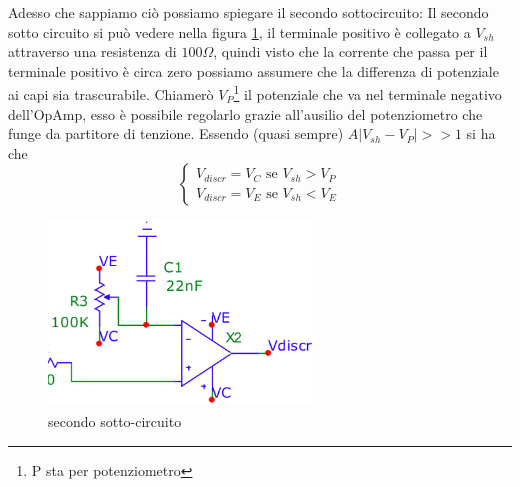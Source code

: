 \documentclass{article}
\begin{document}
			Adesso che sappiamo ciò possiamo spiegare il secondo sottocircuito:
			Il secondo sotto circuito si può vedere nella figura \ref{fig:circ2}, il terminale positivo è collegato a $V_{sh}$ attraverso una resistenza di $100\Omega$, quindi visto che la corrente che passa per il terminale positivo è circa zero possiamo assumere che la differenza di potenziale ai capi sia trascurabile.\newline
			Chiamerò $V_P$\footnote{P sta per potenziometro} il potenziale che va nel terminale negativo dell'OpAmp, esso è possibile regolarlo grazie all'ausilio del potenziometro che funge da partitore di tenzione.\newline
			Essendo (quasi sempre) $A|V_{sh}-V_P|>>1$ si ha che 
			\begin{equation}
				\begin{cases}
					V_{discr}=V_C\textrm{ se } V_{sh}>V_P\\
					V_{discr}=V_E \textrm{ se } V_{sh}<V_E
				\end{cases}
			\end{equation}
			\begin{figure}
				\label{fig:circ2}
				\centering
				\includegraphics[width=70mm]{immagini/circ2a.png}
				\caption{secondo sotto-circuito}
			\end{figure}
\end{document}
